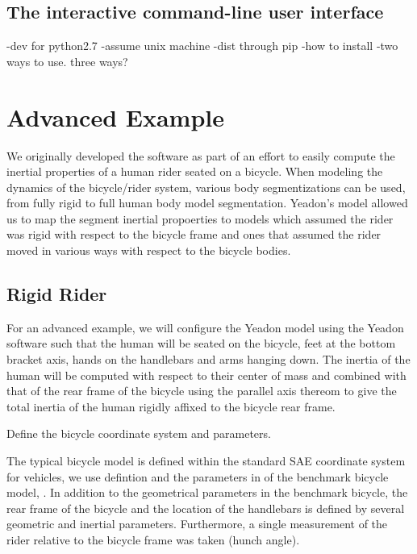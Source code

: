 \documentclass[10pt]{article}
\begin{document}
\subsection*{The interactive command-line user interface}


-dev for python2.7
-assume unix machine
-dist through pip
-how to install
-two ways to use. three ways?


\section*{Advanced Example}
\label{sec:advanced-example}

We originally developed the software as part of an effort to easily compute the
inertial properties of a human rider seated on a bicycle. When modeling the
dynamics of the bicycle/rider system, various body segmentizations can be used,
from fully rigid to full human body model segmentation. Yeadon's model allowed
us to map the segment inertial propoerties to models which assumed the rider
was rigid with respect to the bicycle frame and ones that assumed the rider
moved in various ways with respect to the bicycle bodies.

\subsection*{Rigid Rider}
\label{sec:rigid-rider}

For an advanced example, we will configure the Yeadon model using the Yeadon
software such that the human will be seated on the bicycle, feet at the bottom
bracket axis, hands on the handlebars and arms hanging down. The inertia of the
human will be computed with respect to their center of mass and combined with
that of the rear frame of the bicycle using the parallel axis thereom to give
the total inertia of the human rigidly affixed to the bicycle rear frame.

Define the bicycle coordinate system and parameters.

The typical bicycle model is defined within the standard SAE coordinate system
for vehicles, we use defintion and the parameters in of the benchmark bicycle
model, \cite{Meijaard2007}. In addition to the geometrical parameters in the
benchmark bicycle, the rear frame of the bicycle and the location of the
handlebars is defined by several geometric and inertial parameters.
Furthermore, a single measurement of the rider relative to the bicycle frame
was taken (hunch angle).
\end{document}
